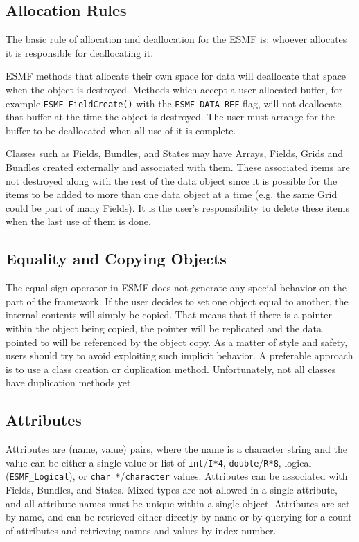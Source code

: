 \subsection{Allocation Rules}

The basic rule of allocation and deallocation for the ESMF is:
whoever allocates it is responsible for deallocating it.

ESMF methods that allocate their own space for data will
deallocate that space when the object is destroyed. 
Methods which accept a user-allocated buffer, for example
{\tt ESMF\_FieldCreate()} with the {\tt ESMF\_DATA\_REF} flag,
will not deallocate that buffer at the time the object is
destroyed.  The user must arrange for the buffer to be deallocated
when all use of it is complete.

Classes such as Fields, Bundles, and States may have Arrays, 
Fields, Grids and Bundles created externally and associated with
them.  These associated items are not destroyed along with the rest  
of the data object since it is possible for the items to be added 
to more than one data object at a time (e.g. the same Grid could 
be part of many Fields).  It is the user's responsibility to delete 
these items when the last use of them is done.

\subsection{Equality and Copying Objects}

The equal sign operator in ESMF does not generate any special 
behavior on the part of the framework.  If the user decides to set
one object equal to another, the internal contents will simply be
copied.  That means that if there is a pointer within the object
being copied, the pointer will be replicated and the data pointed to 
will be referenced by the object copy.  As a matter of style and 
safety, users should try to avoid exploiting such implicit behavior.
A preferable approach is to use a class creation or duplication 
method.  Unfortunately, not all classes have duplication methods yet.

\subsection{Attributes}

Attributes are (name, value) pairs, where
the name is a character string and the value can be either a single
value or list of {\tt int}/{\tt I*4}, {\tt double}/{\tt R*8},
logical ({\tt ESMF\_Logical}), or {\tt char *}/{\tt character} values.
Attributes can be associated with Fields, Bundles, and States. 
Mixed types are not allowed in a single attribute, and all attribute
names must be unique within a single object.    Attributes are set
by name, and can be retrieved either directly by name or by querying
for a count of attributes and retrieving names and values
by index number.

